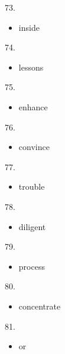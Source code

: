\documentclass[UTF8,11pt]{ctexart}
\begin{document}
73.


\begin{itemize}[leftmargin=2em,itemsep=.2em,topsep=.4em]\item[C.] inside
\end{itemize}

74.


\begin{itemize}[leftmargin=2em,itemsep=.2em,topsep=.4em]\item[C.] lessons
\end{itemize}

75.


\begin{itemize}[leftmargin=2em,itemsep=.2em,topsep=.4em]\item[D.] enhance
\end{itemize}

76.


\begin{itemize}[leftmargin=2em,itemsep=.2em,topsep=.4em]\item[A.] convince
\end{itemize}

77.


\begin{itemize}[leftmargin=2em,itemsep=.2em,topsep=.4em]\item[A.] trouble
\end{itemize}

78.


\begin{itemize}[leftmargin=2em,itemsep=.2em,topsep=.4em]\item[C.] diligent
\end{itemize}

79.


\begin{itemize}[leftmargin=2em,itemsep=.2em,topsep=.4em]\item[C.] process
\end{itemize}

80.


\begin{itemize}[leftmargin=2em,itemsep=.2em,topsep=.4em]\item[B.] concentrate
\end{itemize}

81.


\begin{itemize}[leftmargin=2em,itemsep=.2em,topsep=.4em]\item[D.] or
\end{itemize}
\end{document}

